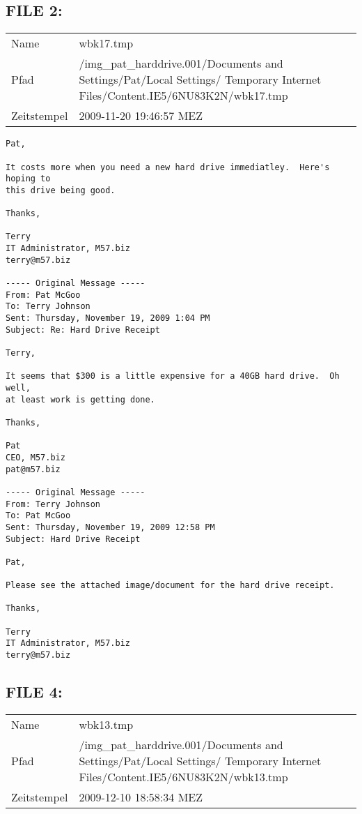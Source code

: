 \subsection{FILE 2:}

\begin{table}[htb]
	\begin{tabular}{p{2cm} p{13.5cm}}
		Name & wbk17.tmp\\
		Pfad & /img_pat_harddrive.001/Documents and Settings/Pat/Local Settings/ Temporary Internet Files/Content.IE5/6NU83K2N/wbk17.tmp\\
		Zeitstempel & 2009-11-20 19:46:57 MEZ
	\end{tabular}
\end{table}		

\begin{lstlisting}
Pat,

It costs more when you need a new hard drive immediatley.  Here's hoping to 
this drive being good.

Thanks,

Terry
IT Administrator, M57.biz
terry@m57.biz

----- Original Message -----
From: Pat McGoo
To: Terry Johnson
Sent: Thursday, November 19, 2009 1:04 PM
Subject: Re: Hard Drive Receipt

Terry,

It seems that $300 is a little expensive for a 40GB hard drive.  Oh well,
at least work is getting done.

Thanks,

Pat
CEO, M57.biz
pat@m57.biz

----- Original Message -----
From: Terry Johnson
To: Pat McGoo
Sent: Thursday, November 19, 2009 12:58 PM
Subject: Hard Drive Receipt

Pat,

Please see the attached image/document for the hard drive receipt.

Thanks,

Terry
IT Administrator, M57.biz
terry@m57.biz

\end{lstlisting}

\subsection{FILE 4:}	

\begin{table}[htb]
	\begin{tabular}{p{2cm} p{13.5cm}}
		Name & wbk13.tmp\\
		Pfad & /img_pat_harddrive.001/Documents and Settings/Pat/Local Settings/ Temporary Internet Files/Content.IE5/6NU83K2N/wbk13.tmp\\
		Zeitstempel & 2009-12-10 18:58:34 MEZ
	\end{tabular}
\end{table}	

